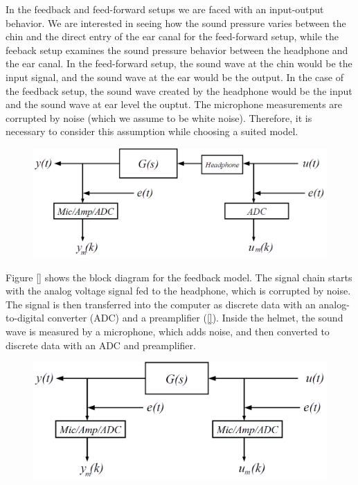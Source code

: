 In the feedback and feed-forward setups we are faced with an input-output behavior. We are interested in seeing how the sound pressure varies between the chin and the direct entry of the ear canal for the feed-forward setup, while the feeback setup examines the sound pressure behavior between the headphone and the ear canal. In the feed-forward setup, the sound wave at the chin would be the input signal, and the sound wave at the ear would be the output. In the case of the feedback setup, the sound wave created by the headphone would be the input and the sound wave at ear level the ouptut. The microphone measurements are corrupted by noise (which we assume to be white noise). Therefore, it is necessary to consider this assumption while choosing a suited model.\\

\begin{figure}[H]
\centering
\includegraphics[width=1.0\textwidth]{pics/modelfb}
\caption{}
\label{pic:}
\end{figure}

Figure \ref{} shows the block diagram for the feedback model. The signal chain starts with the analog voltage signal fed to the headphone, which is corrupted by noise. The signal is then transferred into the computer as discrete data with an analog-to-digital converter (ADC) and a preamplifier (\ref{}). Inside the helmet, the sound wave is measured by a microphone, which adds noise, and then converted to discrete data with an ADC and preamplifier.  \\

\begin{figure}[H]
\centering
\includegraphics[width=1.0\textwidth]{pics/modelff}
\caption{}
\label{pic:}
\end{figure}

